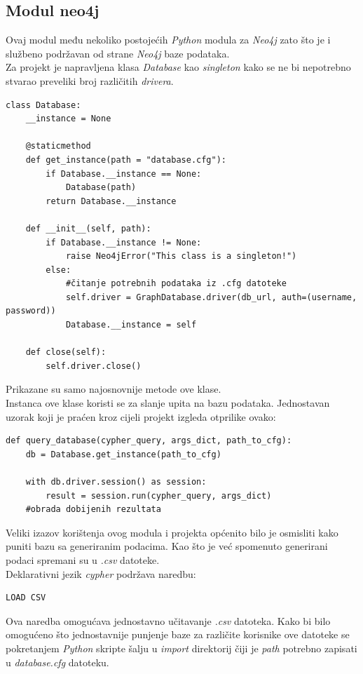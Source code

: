 \documentclass[titlepage, 12pt]{scrartcl}
\begin{document}
\subsection{Modul neo4j}
Ovaj modul među nekoliko postojećih \emph{Python} modula za \emph{Neo4j} zato što je i službeno podržavan od strane \emph{Neo4j} baze podataka. \\
Za projekt je napravljena klasa \emph{Database} kao \emph{singleton} kako se ne bi nepotrebno stvarao preveliki broj različitih \emph{drivera}.
\begin{verbatim}
class Database:
    __instance = None

    @staticmethod
    def get_instance(path = "database.cfg"):
        if Database.__instance == None:
            Database(path)
        return Database.__instance

    def __init__(self, path):
        if Database.__instance != None:
            raise Neo4jError("This class is a singleton!")
        else:
            #čitanje potrebnih podataka iz .cfg datoteke
            self.driver = GraphDatabase.driver(db_url, auth=(username, password))
            Database.__instance = self

    def close(self):
        self.driver.close()
\end{verbatim}
Prikazane su samo najosnovnije metode ove klase. \\
Instanca ove klase koristi se za slanje upita na bazu podataka. Jednostavan uzorak koji je praćen kroz cijeli projekt izgleda otprilike ovako:
\begin{verbatim}
def query_database(cypher_query, args_dict, path_to_cfg):
    db = Database.get_instance(path_to_cfg)
    
    with db.driver.session() as session:
        result = session.run(cypher_query, args_dict)
    #obrada dobijenih rezultata
\end{verbatim}
Veliki izazov korištenja ovog modula i projekta općenito bilo je osmisliti kako puniti bazu sa generiranim podacima. Kao što je već spomenuto generirani podaci spremani su u \emph{.csv} datoteke. \\
Deklarativni jezik \emph{cypher} podržava naredbu: 
\begin{verbatim}
LOAD CSV
\end{verbatim}
Ova naredba omogućava jednostavno učitavanje \emph{.csv} datoteka. Kako bi bilo omogućeno što jednostavnije punjenje baze za različite korisnike ove datoteke se pokretanjem \emph{Python} skripte šalju u \emph{import} direktorij čiji je \emph{path} potrebno zapisati u \emph{database.cfg} datoteku. \\
\end{document}
